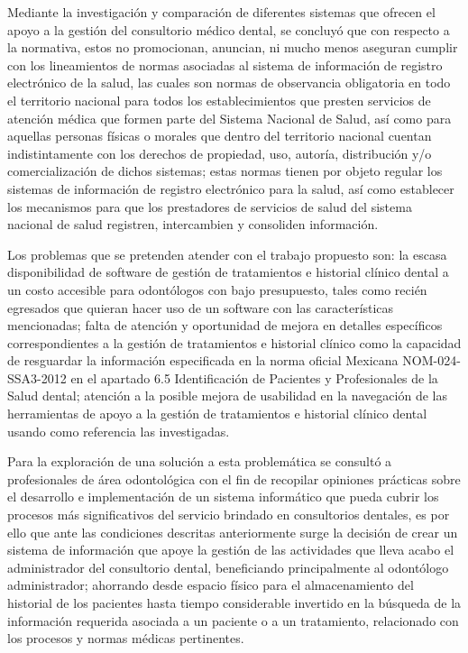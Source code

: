 Mediante la investigación y comparación de diferentes sistemas que ofrecen el apoyo a la gestión del consultorio médico dental, se concluyó que con respecto a la normativa, estos no promocionan, anuncian, ni mucho menos aseguran cumplir con los lineamientos de normas asociadas al sistema de información de registro electrónico de la salud, las cuales son normas de observancia obligatoria en todo el territorio nacional para todos los establecimientos que presten servicios de atención médica que formen parte del Sistema Nacional de Salud, así como para aquellas personas físicas o morales que dentro del territorio nacional cuentan indistintamente con los derechos de propiedad, uso, autoría, distribución y/o comercialización de dichos sistemas; estas normas tienen por objeto regular los sistemas de información de registro electrónico para la salud, así como establecer los mecanismos para que los prestadores de servicios de salud del sistema nacional de salud registren, intercambien y consoliden información.

\vspace{1em}

Los problemas que se pretenden atender con el trabajo propuesto son: la escasa disponibilidad de software de gestión de tratamientos e historial clínico dental a un costo accesible para odontólogos con bajo presupuesto, tales como recién egresados que quieran hacer uso de un software con las características mencionadas; falta de atención y oportunidad de mejora en detalles específicos correspondientes a la gestión de tratamientos e historial clínico como la capacidad de resguardar la información especificada en la norma oficial Mexicana NOM-024-SSA3-2012 en el apartado 6.5 Identificación de Pacientes y Profesionales de la Salud dental; atención a la posible mejora de usabilidad en la navegación de las herramientas de apoyo a la gestión de tratamientos e historial clínico dental usando como referencia las investigadas.

\vspace{1em}

Para la exploración de una solución a esta problemática se consultó a profesionales de área odontológica con el fin de recopilar opiniones prácticas sobre el desarrollo e implementación de un sistema informático que pueda cubrir los procesos más significativos del servicio brindado en consultorios dentales, es por ello que ante las condiciones descritas anteriormente surge la decisión de crear un sistema de información que apoye la gestión de las actividades que lleva acabo el administrador del consultorio dental, beneficiando principalmente al odontólogo administrador; ahorrando desde espacio físico para el almacenamiento del historial de los pacientes hasta tiempo considerable invertido en la búsqueda de la información requerida asociada a un paciente o a un tratamiento, relacionado con los procesos y normas médicas pertinentes.


